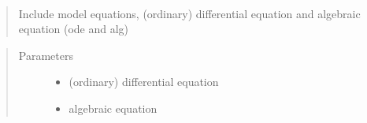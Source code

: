 \documentclass[letterpaper,10pt,english]{sphinxmanual}
\begin{document}
\begin{fulllineitems}
\begin{fulllineitems}
\label{\detokenize{yaocptool.modelling:yaocptool.modelling.system_model.SystemModel.include_models}}
\end{fulllineitems}


\begin{fulllineitems}
\label{\detokenize{yaocptool.modelling:yaocptool.modelling.system_model.SystemModel.include_parameter}}
\end{fulllineitems}


\begin{fulllineitems}
\label{\detokenize{yaocptool.modelling:yaocptool.modelling.system_model.SystemModel.include_state}}
\end{fulllineitems}


\begin{fulllineitems}
\label{\detokenize{yaocptool.modelling:yaocptool.modelling.system_model.SystemModel.include_system_equations}}~\begin{quote}

Include model equations, (ordinary) differential equation and algebraic equation (ode and alg)
\end{quote}
\begin{quote}\begin{description}
\item[{Parameters}] \leavevmode\begin{itemize}
\item {} 
 \textendash{} (ordinary) differential equation

\item {} 
 \textendash{} algebraic equation


\end{itemize}
\end{description}
\end{quote}
\end{fulllineitems}
\end{fulllineitems}
\end{document}
